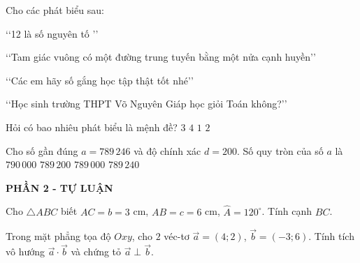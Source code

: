 \begin{ex}%
	Cho các phát biểu sau:
	\begin{enumEX}[1.]{1}
		\item \lq\lq 12 là số nguyên tố \rq\rq 
		\item \lq\lq Tam giác vuông có một đường trung tuyến bằng một nửa cạnh huyền\rq\rq 
		\item \lq\lq Các em hãy số gắng học tập thật tốt nhé\rq\rq 
		\item \lq\lq Học sinh trường THPT Võ Nguyên Giáp học giỏi Toán không?\rq\rq
	\end{enumEX}
	Hỏi có bao nhiêu phát biểu là mệnh đề?
	\choice
	{$3$}
	{$4$}
	{$1$}
	{\True $2$}
\end{ex}

\begin{ex}%
	Cho số gần đúng $a=789\,246$ và độ chính xác $d=200$. Số quy tròn của số $a$ là
	\choice
	{$790\,000$}
	{$789\,200$}
	{\True $789\,000$}
	{$789\,240$}
\end{ex}
  \begin{center}
  	\textbf{PHẦN 2 - TỰ LUẬN}
  \end{center}

\begin{bt}%
	Cho $\triangle ABC$ biết $AC=b=3$ cm, $AB=c=6$ cm, $\widehat{A}=120^\circ$. Tính cạnh $BC$.
\end{bt}

\begin{bt}%
	Trong mặt phẳng tọa độ $Oxy$, cho $2$ véc-tơ $\overrightarrow{a}=(4;2)$, $\overrightarrow{b}=(-3;6)$. Tính tích vô hướng $\overrightarrow{a}\cdot \overrightarrow{b}$ và chứng tỏ $\overrightarrow{a}\perp\overrightarrow{b}$.
\end{bt}

